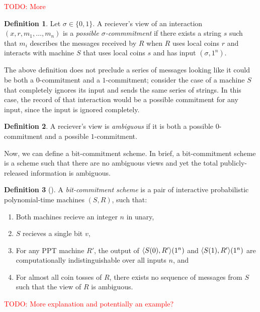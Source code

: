 \documentclass[english,12pt]{reedthesis}
\theoremstyle{plain}
\theoremstyle{definition}
\newtheorem{defn}[defn]{Definition}
\theoremstyle{remark}
\DeclarePairedDelimiter{\ang}{\langle}{\rangle}
\newcommand{\TODO}[1]{\textcolor{red}{TODO: #1}}
\begin{document}
\TODO{More}

\begin{defn}\label{def:possible-commit}
  Let $\sigma \in \{0, 1\}$. A reciever's view of an interaction
  $(x, r, m_{1}, \ldots, m_{n})$ is a \emph{possible $\sigma$-commmitment} if there exists
  a string $s$ such that $m_{i}$ describes the messages received by $R$ when $R$
  uses local coins $r$ and interacts with machine $S$ that uses local coins $s$
  and has input $(\sigma, 1^{n})$.
\end{defn}

The above definition does not preclude a series of messages looking like it
could be both a $0$-commitment and a $1$-commitment; consider the case of a
machine $S$ that completely ignores its input and sends the same series of
strings. In this case, the record of that interaction would be a possible
commitment for any input, since the input is ignored completely.

\begin{defn}\label{def:ambiguous-view}
  A reciever's view is \emph{ambiguous} if it is both a possible $0$-commitment
  and a possible $1$-commitment.
\end{defn}

Now, we can define a bit-commitment scheme. In brief, a bit-commitment scheme is
a scheme such that there are no ambiguous views and yet the total
publicly-released information is ambiguous.

\begin{defn}[{\cite[Def.\ 4.4.1]{Go01}}]\label{def:commitment-scheme}
  A \emph{bit-commitment scheme} is a pair of interactive probabilistic
  polynomial-time machines $(S, R)$, such that:
  \begin{enumerate}
    \item Both machines recieve an integer $n$ in unary,
    \item $S$ recieves a single bit $v$,
    \item For any PPT machine $R'$, the output of $\ang{S(0), R'}(1^{n})$ and
          $\ang{S(1), R'}(1^{n})$ are computationally indistinguishable over all
          inputs $n$, and
    \item For almost all coin tosses of $R$, there exists no sequence of
          messages from $S$ such that the view of $R$ is ambiguous.
  \end{enumerate}
\end{defn}

\TODO{More explanation and potentially an example?}
\end{document}

